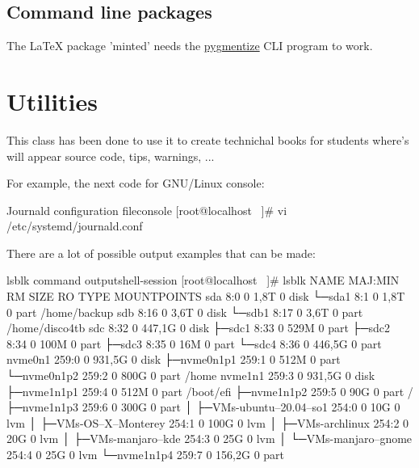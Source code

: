 \documentclass{yukibook}
\begin{document}
\section{Command line packages}
The \LaTeX{} package 'minted' needs the \href{https://pygments.org/}{pygmentize} CLI program to work.


\chapter{Utilities}
This class has been done to use it to create technichal books for students where's will appear source code, tips, warnings, ...

For example, the next code for GNU/Linux console:

\begin{mycode}{Journald configuration file}{console}{}
[root@localhost ~]# vi /etc/systemd/journald.conf
\end{mycode}

There are a lot of possible output examples that can be made:

\begin{mycode}{lsblk command output}{shell-session}{}
[root@localhost ~]# lsblk
NAME                       MAJ:MIN RM   SIZE RO TYPE MOUNTPOINTS
sda                          8:0    0   1,8T  0 disk
└─sda1                       8:1    0   1,8T  0 part /home/backup
sdb                          8:16   0   3,6T  0 disk
└─sdb1                       8:17   0   3,6T  0 part /home/disco4tb
sdc                          8:32   0 447,1G  0 disk
├─sdc1                       8:33   0   529M  0 part
├─sdc2                       8:34   0   100M  0 part
├─sdc3                       8:35   0    16M  0 part
└─sdc4                       8:36   0 446,5G  0 part
nvme0n1                    259:0    0 931,5G  0 disk
├─nvme0n1p1                259:1    0   512M  0 part
└─nvme0n1p2                259:2    0   800G  0 part /home
nvme1n1                    259:3    0 931,5G  0 disk
├─nvme1n1p1                259:4    0   512M  0 part /boot/efi
├─nvme1n1p2                259:5    0    90G  0 part /
├─nvme1n1p3                259:6    0   300G  0 part
│ ├─VMs-ubuntu--20.04--so1 254:0    0    10G  0 lvm
│ ├─VMs-OS--X--Monterey    254:1    0   100G  0 lvm
│ ├─VMs-archlinux          254:2    0    20G  0 lvm
│ ├─VMs-manjaro--kde       254:3    0    25G  0 lvm
│ └─VMs-manjaro--gnome     254:4    0    25G  0 lvm
└─nvme1n1p4                259:7    0 156,2G  0 part
\end{mycode}
\end{document}
